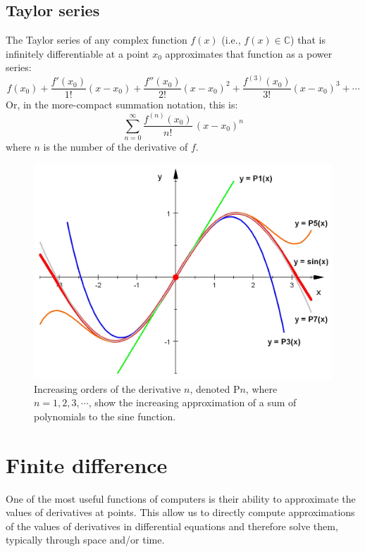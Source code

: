 \documentclass[a4paper,10pt]{scrartcl}
\begin{document}
\subsection{Taylor series}

The Taylor series of any complex function $f(x)$ (i.e., $f(x) \in \mathbb{C}$) that is infinitely differentiable at a point $x_0$ approximates that function as a power series:
\begin{equation}
f(x_0)+\frac {f'(x_0)}{1!} (x-x_0)+ \frac{f''(x_0)}{2!} (x-x_0)^2+\frac{f^{(3)}(x_0)}{3!}(x-x_0)^3+ \cdots
\end{equation}
Or, in the more-compact summation notation, this is:
\begin{equation}
\sum_{n=0} ^ {\infty} \frac {f^{(n)}(x_0)}{n!} \, (x-x_0)^{n}
\end{equation}
where $n$ is the number of the derivative of $f$.

\begin{figure}[!ht]
\begin{center}
\includegraphics[width=.8\linewidth]{figures/NumericalAndMath/Taylor_Approximation_of_sin(x).jpeg}
\end{center}
\caption{Increasing orders of the derivative $n$, denoted P$n$, where $n = 1, 2, 3, \cdots$, show the increasing approximation of a sum of polynomials to the sine function.}
\end{figure}

\section{Finite difference}

One of the most useful functions of computers is their ability to approximate the values of derivatives at points. This allow us to directly compute approximations of the values of derivatives in differential equations and therefore solve them, typically through space and/or time.
\end{document}
